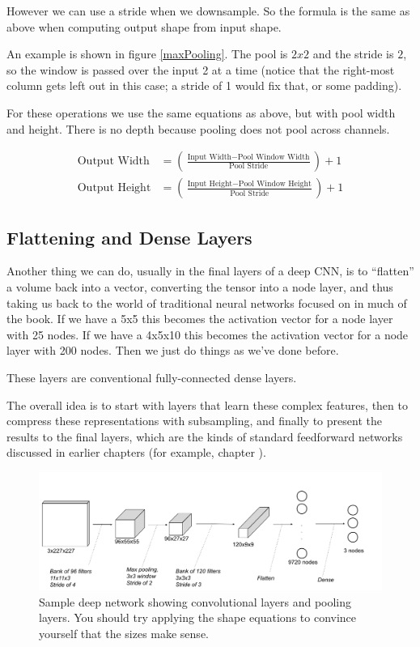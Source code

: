However we can use a stride when we downsample. So the formula is the same as above when computing output shape from input shape.

An example is shown in figure \ref{maxPooling}. The pool is $2 x 2$ and the stride is $2$, so the window is passed over the input 2 at a time (notice that the right-most column gets left out in this case; a stride of 1 would fix that, or some padding). 

For these operations we use the same equations as above, but with pool width and height. There is no depth because pooling does not pool across channels.

\begin{align*}
\text{Output Width} &= \left( \frac{\text{Input Width} - \text{Pool Window Width}}{\text{Pool Stride}} \right) + 1 \\
\text{Output Height} &= \left( \frac{\text{Input Height} - \text{Pool Window Height}}{\text{Pool Stride}} \right) + 1
\end{align*} 

\subsection{Flattening and Dense Layers}

Another thing we can do, usually in the final layers of a deep CNN, is to ``flatten'' a volume back into a vector, converting the tensor into a node layer, and thus taking us back to the world of traditional neural networks focused on in much of the book. If we have a 5x5 this becomes the activation vector for a node layer with 25 nodes. If we have a 4x5x10 this becomes the activation vector for a node layer with 200 nodes. Then we just do things as we've done before.

These layers are conventional fully-connected dense layers. 
	
The overall idea is to start with layers that learn these complex features, then to compress these representations with subsampling, and finally to present the results to the final layers, which are the kinds of standard feedforward networks discussed in earlier chapters (for example, chapter ).

\begin{figure}[h]
\centering
\includegraphics[scale=.45]{./images/deepNetExample.png}
\caption[Soraya Boza and Jeff Yoshimi ]{Sample deep network showing convolutional layers and pooling layers. You should try applying the shape equations to convince yourself that the sizes make sense. }
\label{deepNetExample}
\end{figure}


